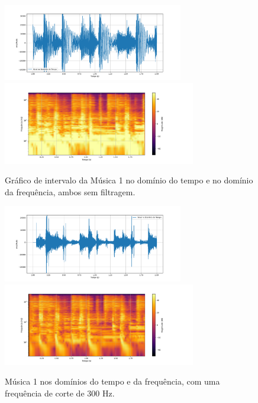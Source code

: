\begin{figure}[htpb]
    \centering
    \includegraphics[width=0.7\textwidth]{figuras/fig40.png}
    \includegraphics[width=0.75\textwidth]{figuras/fig41.png}
    \caption{Gráfico de intervalo da Música 1 no domínio do tempo e no domínio da frequência, ambos sem filtragem.}
    \label{fig40}
\end{figure}
\begin{figure}[htpb]
    \centering
    \includegraphics[width=0.7\textwidth]{figuras/fig28.png}
    \includegraphics[width=0.75\textwidth]{figuras/fig29.png}
    \caption{Música 1 nos domínios do tempo e da frequência, com uma frequência de corte de 300 Hz.}
    \label{fig28}
\end{figure}

